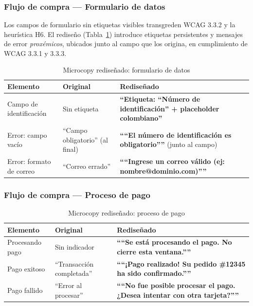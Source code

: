 \documentclass[conference]{IEEEtran}
\newcommand{\buenEjemplo}[1]{\textcolor{colorBueno}{\textbf{``#1''}}}
\begin{document}
\subsubsection{Flujo de compra — Formulario de datos}

Los campos de formulario sin etiquetas visibles transgreden WCAG 3.3.2 y la heurística H6. El rediseño (Tabla~\ref{tab:formulario}) introduce etiquetas persistentes y mensajes de error \textit{proxémicos}, ubicados junto al campo que los origina, en cumplimiento de WCAG 3.3.1 y 3.3.3.

\begin{table}[H]
\centering
\caption{Microcopy rediseñado: formulario de datos}
\label{tab:formulario}
\setlength{\tabcolsep}{3pt}
\renewcommand{\arraystretch}{1.2}
\begin{tabular}{|p{1.8cm}|p{2.2cm}|p{3cm}|}
\hline
\textbf{Elemento} & \textbf{Original} & \textbf{Rediseñado} \\
\hline
Campo de identificación & Sin etiqueta & \buenEjemplo{Etiqueta: ``Número de identificación'' + placeholder colombiano} \\
\hline
Error: campo vacío & ``Campo obligatorio'' (al final) & \buenEjemplo{``El número de identificación es obligatorio''} (junto al campo) \\
\hline
Error: formato de correo & ``Correo errado'' & \buenEjemplo{``Ingrese un correo válido (ej: nombre@dominio.com)''} \\
\hline
\end{tabular}
\end{table}

\subsubsection{Flujo de compra — Proceso de pago}

\begin{table}[H]
\centering
\caption{Microcopy rediseñado: proceso de pago}
\label{tab:pago}
\setlength{\tabcolsep}{3pt}
\renewcommand{\arraystretch}{1.2}
\begin{tabular}{|p{1.8cm}|p{2.2cm}|p{3cm}|}
\hline
\textbf{Elemento} & \textbf{Original} & \textbf{Rediseñado} \\
\hline
Procesando pago & Sin indicador & \buenEjemplo{``Se está procesando el pago. No cierre esta ventana.''} \\
\hline
Pago exitoso & ``Transacción completada'' & \buenEjemplo{``¡Pago realizado! Su pedido \#12345 ha sido confirmado.''} \\
\hline
Pago fallido & ``Error al procesar'' & \buenEjemplo{``No fue posible procesar el pago. ¿Desea intentar con otra tarjeta?''} \\
\hline
\end{tabular}
\end{table}
\end{document}
